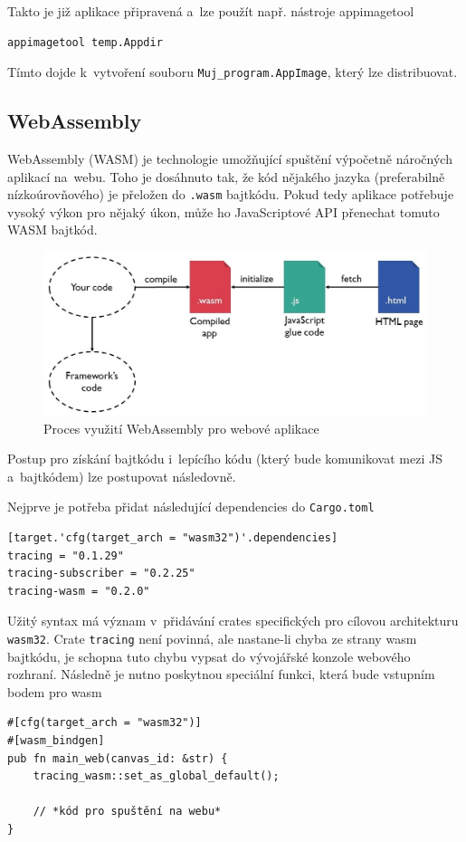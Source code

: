\documentclass[a4paper, 12pt, twoside]{article} %
\begin{document}
		Takto je již aplikace připravená a~lze použít např. nástroje appimagetool\cite{appimagetool}
		\begin{verbatim}
appimagetool temp.Appdir
		\end{verbatim}

		Tímto dojde k~vytvoření souboru \texttt{Muj\_program.AppImage}, který lze distribuovat.


	\subsection{WebAssembly}
		WebAssembly (WASM) je technologie umožňující spuštění výpočetně náročných aplikací na~webu. Toho je dosáhnuto tak, že kód nějakého jazyka (preferabilně nízkoúrovňového) je přeložen do \texttt{.wasm} bajtkódu. Pokud tedy aplikace potřebuje vysoký výkon pro nějaký úkon, může ho JavaScriptové API přenechat tomuto WASM bajtkód.\cite{wasm}
		
		\begin{center}
			\begin{figure}[H]
				\centering
				\includegraphics[width=13cm]{wasm}
				\caption{Proces využití WebAssembly pro webové aplikace \cite{wasm_fig}}
				\label{fig:wasm}
			\end{figure}
		\end{center}
		
		Postup pro získání bajtkódu i~lepícího kódu (který bude komunikovat mezi JS a~bajtkódem) lze postupovat následovně.
		
		Nejprve je potřeba přidat následující dependencies do \texttt{Cargo.toml}
		\begin{verbatim}
[target.'cfg(target_arch = "wasm32")'.dependencies]
tracing = "0.1.29"
tracing-subscriber = "0.2.25"
tracing-wasm = "0.2.0"
		\end{verbatim}
		
		Užitý syntax má význam v~přidávání crates specifických pro cílovou architekturu \texttt{wasm32}. Crate \texttt{tracing} není povinná, ale nastane-li chyba ze strany wasm bajtkódu, je schopna tuto chybu vypsat do vývojářské konzole webového rozhraní. Následně je nutno poskytnou speciální funkci, která bude vstupním bodem pro wasm
		\begin{verbatim}
#[cfg(target_arch = "wasm32")]
#[wasm_bindgen]
pub fn main_web(canvas_id: &str) {
	tracing_wasm::set_as_global_default();

	// *kód pro spuštění na webu*
}
		\end{verbatim}
		
\end{document}
